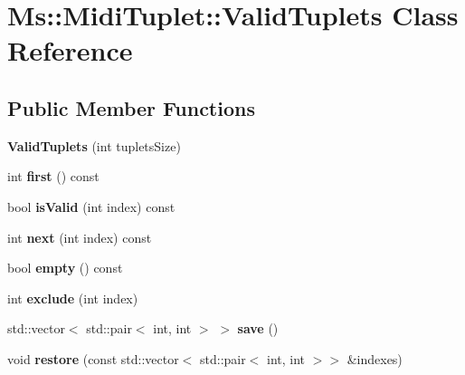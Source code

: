 \hypertarget{class_ms_1_1_midi_tuplet_1_1_valid_tuplets}{}\section{Ms\+:\+:Midi\+Tuplet\+:\+:Valid\+Tuplets Class Reference}
\label{class_ms_1_1_midi_tuplet_1_1_valid_tuplets}
\subsection*{Public Member Functions}
\begin{DoxyCompactItemize}
\item 
\mbox{\label{class_ms_1_1_midi_tuplet_1_1_valid_tuplets_a07a211a2547fbd33b868bfb8372f9918}} 
{\bfseries Valid\+Tuplets} (int tuplets\+Size)
\item 
\mbox{\label{class_ms_1_1_midi_tuplet_1_1_valid_tuplets_a52f1dd16d0ca4fecbdbe85e9a9169d99}} 
int {\bfseries first} () const
\item 
\mbox{\label{class_ms_1_1_midi_tuplet_1_1_valid_tuplets_a29e0f4abdc65f29d0afd96f7b9bfb81b}} 
bool {\bfseries is\+Valid} (int index) const
\item 
\mbox{\label{class_ms_1_1_midi_tuplet_1_1_valid_tuplets_abc25c5085bdd36349afd8e7b4d612c01}} 
int {\bfseries next} (int index) const
\item 
\mbox{\label{class_ms_1_1_midi_tuplet_1_1_valid_tuplets_ab73dea1d30f247ff1b6b47a459368cd6}} 
bool {\bfseries empty} () const
\item 
\mbox{\label{class_ms_1_1_midi_tuplet_1_1_valid_tuplets_a207e798210eb82d0a50576c8f9fe4447}} 
int {\bfseries exclude} (int index)
\item 
\mbox{\label{class_ms_1_1_midi_tuplet_1_1_valid_tuplets_a259a8ddda3083c2ba6ae011dc10b1b96}} 
std\+::vector$<$ std\+::pair$<$ int, int $>$ $>$ {\bfseries save} ()
\item 
\mbox{\label{class_ms_1_1_midi_tuplet_1_1_valid_tuplets_a491449a2d116f96bd047eba13f727119}} 
void {\bfseries restore} (const std\+::vector$<$ std\+::pair$<$ int, int $>$$>$ \&indexes)
\end{DoxyCompactItemize}


